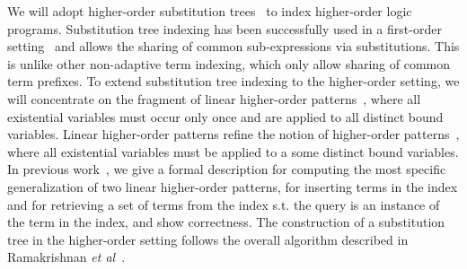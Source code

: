 \documentclass{llncs}
\begin{document}
We will adopt higher-order substitution
trees~\cite{Pientka:ICLP03,Pientka03phd} to index higher-order logic
programs. Substitution tree indexing has been successfully used in a
first-order setting~\cite{Graf+Book95} and allows the sharing of
common sub-expressions via substitutions. This is unlike other
non-adaptive term indexing, which only allow sharing of common term
prefixes. To extend substitution tree indexing to the higher-order
setting, we will concentrate on the fragment of linear higher-order
patterns~\cite{PientkaPfenning:CADE03}, where all existential
variables must occur only once and are applied to all distinct bound
variables. Linear higher-order patterns refine the notion of
higher-order patterns~\cite{Miller91iclp}, where all existential
variables must be applied to a some distinct bound variables.  In
previous work~\cite{Pientka:ICLP03,Pientka03phd}, we give a formal
description for computing the most specific generalization of two
linear higher-order patterns, for inserting terms in the index and for
retrieving a set of terms from the index s.t. the query is an instance
of the term in the index, and show correctness. The construction of a
substitution tree in the higher-order setting follows the overall
algorithm described in Ramakrishnan {\em et
al}~\cite{Ramakrishnan01:indexing}.

\end{document}
